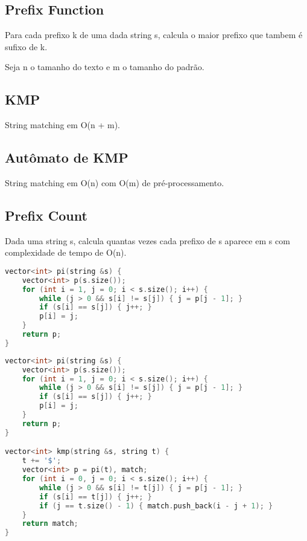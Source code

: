 \documentclass[11pt, a4paper, twoside]{article}
\begin{document}
\subsection{Prefix Function}


Para cada prefixo k de uma dada string s, calcula o maior prefixo que tambem é sufixo de k.

Seja n o tamanho do texto e m o tamanho do padrão.

\subsection{KMP}


String matching em O(n + m).

\subsection{Autômato de KMP}


String matching em O(n) com O(m) de pré-processamento.

\subsection{Prefix Count}


Dada uma string s, calcula quantas vezes cada prefixo de s aparece em s com complexidade de tempo de O(n).

\begin{lstlisting}[language=C++]
vector<int> pi(string &s) {
    vector<int> p(s.size());
    for (int i = 1, j = 0; i < s.size(); i++) {
        while (j > 0 && s[i] != s[j]) { j = p[j - 1]; }
        if (s[i] == s[j]) { j++; }
        p[i] = j;
    }
    return p;
}
\end{lstlisting}

\begin{lstlisting}[language=C++]
vector<int> pi(string &s) {
    vector<int> p(s.size());
    for (int i = 1, j = 0; i < s.size(); i++) {
        while (j > 0 && s[i] != s[j]) { j = p[j - 1]; }
        if (s[i] == s[j]) { j++; }
        p[i] = j;
    }
    return p;
}

vector<int> kmp(string &s, string t) {
    t += '$';
    vector<int> p = pi(t), match;
    for (int i = 0, j = 0; i < s.size(); i++) {
        while (j > 0 && s[i] != t[j]) { j = p[j - 1]; }
        if (s[i] == t[j]) { j++; }
        if (j == t.size() - 1) { match.push_back(i - j + 1); }
    }
    return match;
}
\end{lstlisting}
\end{document}
